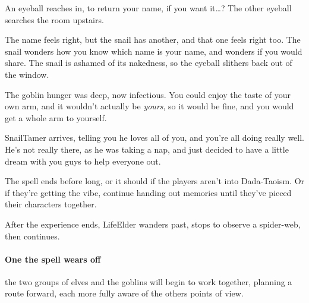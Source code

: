 \begin{multicols}{2}
\begin{boxtext}
    An eyeball reaches in, to return your name, if you want it\ldots ?
    The other eyeball searches the room upstairs.

    The name feels right, but the snail has another, and that one feels right too.
    The snail wonders how you know which name is your name, and wonders if you would share.
    The snail is ashamed of its nakedness, so the eyeball slithers back out of the window.

    The goblin hunger was deep, now infectious.
    You could enjoy the taste of your own arm, and it wouldn't actually be \emph{yours}, so it would be fine, and you would get a whole arm to yourself.

    \Gls{SnailTamer} arrives, telling you he loves all of you, and you're all doing really well.
    He's not really there, as he was taking a nap, and just decided to have a little dream with you guys to help everyone out.

\end{boxtext}

The spell ends before long, or it should if the players aren't into Dada-Taoism.
Or if they're getting the vibe, continue handing out memories until they've pieced their characters together.

After the experience ends, \gls{LifeElder} wanders past, stops to observe a spider-web, then continues.

\paragraph{One the spell wears off}
the two groups of elves and the goblins will begin to work together, planning a route forward, each more fully aware of the others points of view.

\iftoggle{verbose}{
  \subsection{Broken Resolutions}

  If your table runs out of time for the night, and you need to wrap everything up quickly, switch to \gls{downtime} plans, and give each \gls{pc} \pgls{action}.
  If they want to negotiate with \gls{MindElder}, they might roll \roll{Intelligence}{Empathy}, or if they think it's time to kill those \glspl{ogre}, sleeping in their \glspl{sepulchre}.

  For some added drama, ask each player to roll under a cup, napkin, or sleeve.
  Leave the \gls{natural} hidden until everyone has decided what they want to do.
  One all results are in, determine the outcomes based entirely on the rolls.
  If \pgls{pc} spent the entire \gls{downtime} trying to redirect the river through \gls{shadepaths}, it could \gls{flood} the \gls{sunway} and block snails from accessing \gls{ravencops}.
  Or if they spent their time trying to kill \glspl{ogre}, a failed roll could mean that \pgls{ogre} eats the \gls{pc} alive before marauding around \gls{ravencops}.
}{

}
\end{multicols}
